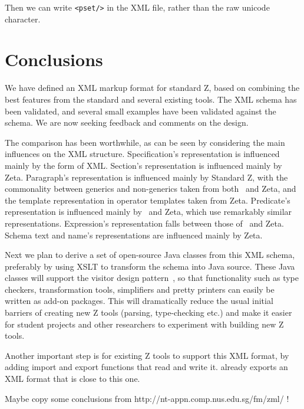 \documentclass{llncs}  %
\newcommand{\Zeta}{Zeta}
\begin{document}
Then we can write \verb!<pset/>! in the XML file, rather than
the raw unicode character.


\section{Conclusions}

We have defined an XML markup format for standard Z, based on
combining the best features from the standard and several existing 
tools.  The XML schema has been validated, and several small examples
have been validated against the schema.  We are now seeking feedback 
and comments on the design.

The comparison has been worthwhile,
as can be seen by considering the main influences on the XML structure.
Specification's representation is influenced mainly by the form of XML.
Section's representation is influenced mainly by \Zeta.
Paragraph's representation is influenced mainly by Standard Z,
with the commonality between generics and non-generics taken from
both \CADiZ\ and \Zeta,
and the template representation in operator templates taken from \Zeta.
Predicate's representation is influenced mainly by \CADiZ\ and \Zeta,
which use remarkably similar representations.
Expression's representation falls between those of \CADiZ\ and \Zeta.
Schema text and name's representations are influenced mainly by \Zeta.

Next we plan to derive a set of open-source Java classes from this XML
schema, preferably by using XSLT to transform the schema into Java source.
These Java classes will support the visitor design
pattern~\cite{PatternsBook???}, so that functionality such as type checkers,
transformation tools, simplifiers and pretty printers can easily be written
as add-on packages.  This will dramatically reduce the usual initial
barriers of creating new Z tools (parsing, type-checking etc.) and make it
easier for student projects and other researchers to experiment with
building new Z tools.

Another important step is for existing Z tools to support this
XML format, by adding import and export functions that read and write it.
{\CADiZ} already exports an XML format that is close to this one.

Maybe copy some conclusions from http://nt-appn.comp.nus.edu.sg/fm/zml/ !



\end{document}
